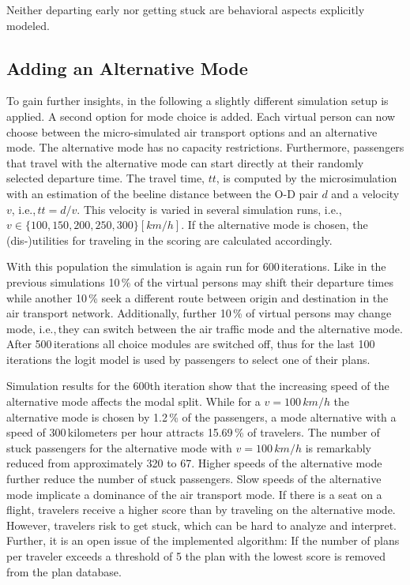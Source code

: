 Neither departing early nor getting stuck are behavioral aspects explicitly modeled.  

\subsection{Adding an Alternative Mode}
To gain further insights, in the following a slightly different simulation setup is applied. 
A second option for mode choice is added. 
Each virtual person can now choose between the micro-simulated air transport options and an alternative mode. 
The alternative mode has no capacity restrictions. 
Furthermore, passengers that travel with the alternative mode can start directly at their randomly selected departure time. 
The travel time, $tt$, is computed by the microsimulation with an estimation of the beeline distance between the O-D pair $d$ and a velocity $v$, i.e.,\,$tt = d / v$.  
This velocity is varied in several simulation runs, i.e.,\,$v \in \{100, 150, 200, 250, 300 \} [km/h]$. 
If the alternative mode is chosen, the (dis-)utilities for traveling in the scoring are calculated accordingly.  

With this population the simulation is again run for 600\,iterations. 
Like in the previous simulations 10\,\% of the virtual persons may shift their departure times while another 10\,\% seek a different route between origin and destination in the air transport network. 
Additionally, further 10\,\% of virtual persons may change mode, i.e.,\,they can switch between the air traffic mode and the alternative mode. 
After 500\,iterations all choice modules are switched off, thus for the last 100\,iterations the logit model is used by passengers to select one of their plans. 

Simulation results for the 600th iteration show that the increasing speed of the alternative mode affects the modal split.  
While for a $v = 100 \, km/h$ the alternative mode is chosen by 1.2\,\% of the passengers, a mode alternative with a speed of 300\,kilometers per hour attracts 15.69\,\% of travelers. 
The number of stuck passengers for the alternative mode with $v = 100 \, km/h$ is remarkably reduced from approximately 320 to 67. 
Higher speeds of the alternative mode further reduce the number of stuck passengers. 
Slow speeds of the alternative mode implicate a dominance of the air transport mode. 
If there is a seat on a flight, travelers receive a higher score than by traveling on the alternative mode. 
However, travelers risk to get stuck, which can be hard to analyze and interpret. 
Further, it is an open issue of the implemented algorithm: If the number of plans per traveler exceeds a threshold of 5 the plan with the lowest score is removed from the plan database. 

